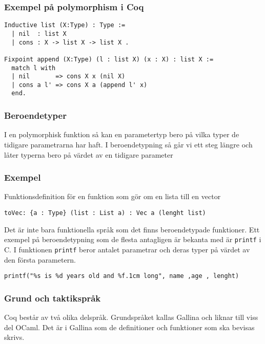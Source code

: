 \subsubsection{Exempel på polymorphism i Coq}
\begin{verbatim}
Inductive list (X:Type) : Type :=
  | nil  : list X
  | cons : X -> list X -> list X .

Fixpoint append (X:Type) (l : list X) (x : X) : list X :=
  match l with
  | nil       => cons X x (nil X)
  | cons a l' => cons X a (append l' x)
  end.
\end{verbatim}

\subsubsection{Beroendetyper}
I en polymorphisk funktion så kan en parametertyp bero på vilka typer de
tidigare parametrarna har haft. I beroendetypning så går vi ett steg längre och
låter typerna bero på värdet av en tidigare parameter

\subsubsection{Exempel}
Funktionsdefinition för en funktion som gör om en lista till en vector
\begin{verbatim}
toVec: {a : Type} (list : List a) : Vec a (lenght list)
\end{verbatim}
Det är inte bara funktionella språk som det finns beroendetypade funktioner.
Ett exempel på beroendetypning som de flesta antagligen är bekanta med är
\texttt{printf} i C. I funktionen \texttt{printf} beror antalet parametrar och
deras typer på värdet av den första parametern.

\begin{verbatim}
printf("%s is %d years old and %f.1cm long", name ,age , lenght)
\end{verbatim}

\begin{comment}
CoqArt
http://mattam.org/research/publications/Programming_with_Dependent_Types_in_Coq-PPS-260209.pdf
** DONE Grund och taktikspråk
   CLOSED: [2013-05-10 fre 10:41]
\end{comment}

\subsubsection{Grund och taktikspråk}
Coq består av två olika delspråk. Grundspråket kallas Gallina och liknar till
viss del OCaml. Det är i Gallina som de definitioner och funktioner som ska
bevisas skrivs.

